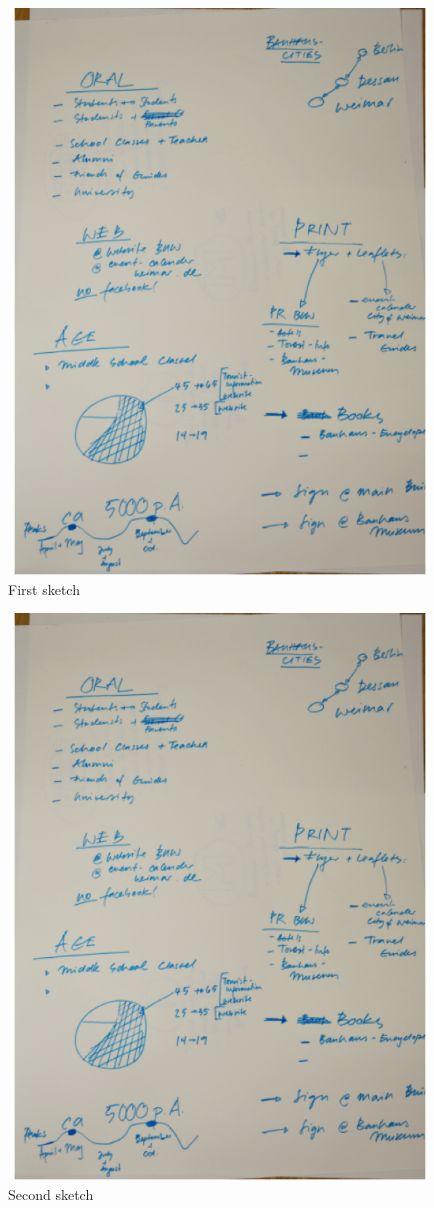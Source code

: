\begin{figure}[H]
    \centering
    \includegraphics[width=12cm,height=15cm]{Appendices/4/sk1}%
    \caption{First sketch}%
    \label{fig:Sk1}%
\end{figure}


\begin{figure}[H]
    \centering
    \includegraphics[width=12cm,height=15cm]{Appendices/4/sk2}%
    \caption{Second sketch}%
    \label{fig:Sk2}%
\end{figure}

